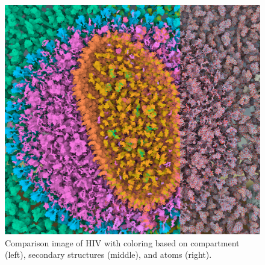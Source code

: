 \documentclass{egpubl}
\begin{document}
	
	\begin{figure}
		\centering
		\includegraphics[width=1\linewidth]{Figures/all3}
		\caption{Comparison image of HIV with coloring based on compartment (left), secondary structures (middle), and atoms (right).}
		\label{fig:NoiseDifference}
	\end{figure} 
	
	
	
\end{document}
